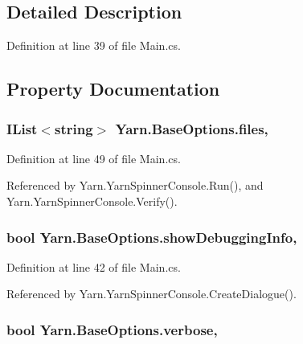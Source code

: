 \subsection{Detailed Description}


Definition at line 39 of file Main.\-cs.



\subsection{Property Documentation}
\hypertarget{a00043_aa93cbb1bc1d5328e0a417012621e92d2}{
\subsubsection[{files}]{\setlength{\rightskip}{0pt plus 5cm}I\-List$<$string$>$ Yarn.\-Base\-Options.\-files\hspace{0.3cm}{\ttfamily [get]}, {\ttfamily [set]}}}\label{a00043_aa93cbb1bc1d5328e0a417012621e92d2}


Definition at line 49 of file Main.\-cs.



Referenced by Yarn.\-Yarn\-Spinner\-Console.\-Run(), and Yarn.\-Yarn\-Spinner\-Console.\-Verify().

\hypertarget{a00043_a89964ea17bd19caf00cb5bff563ed01c}{
\subsubsection[{show\-Debugging\-Info}]{\setlength{\rightskip}{0pt plus 5cm}bool Yarn.\-Base\-Options.\-show\-Debugging\-Info\hspace{0.3cm}{\ttfamily [get]}, {\ttfamily [set]}}}\label{a00043_a89964ea17bd19caf00cb5bff563ed01c}


Definition at line 42 of file Main.\-cs.



Referenced by Yarn.\-Yarn\-Spinner\-Console.\-Create\-Dialogue().

\hypertarget{a00043_ada4d83d1756918f362d55f6649b82b17}{
\subsubsection[{verbose}]{\setlength{\rightskip}{0pt plus 5cm}bool Yarn.\-Base\-Options.\-verbose\hspace{0.3cm}{\ttfamily [get]}, {\ttfamily [set]}}}\label{a00043_ada4d83d1756918f362d55f6649b82b17}


